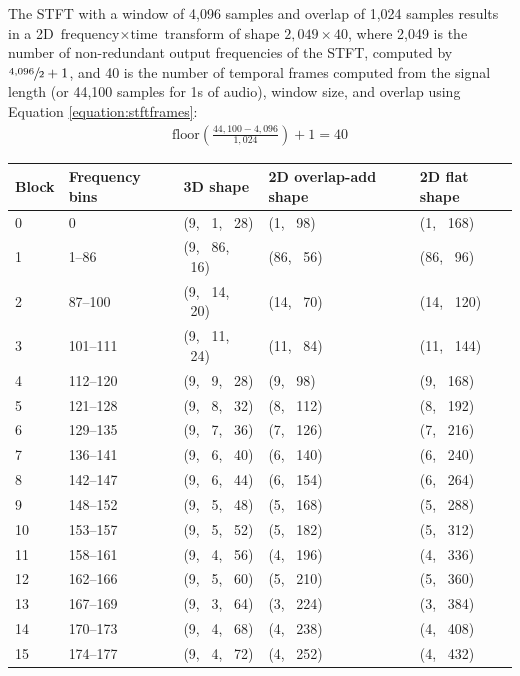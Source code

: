 \documentclass[report.tex]{subfiles}
\begin{document}
The STFT with a window of 4,096 samples and overlap of 1,024 samples results in a 2D $\text{frequency} \times \text{time}$ transform of shape $2{,}049 \times 40$, where 2,049 is the number of non-redundant output frequencies of the STFT, computed by $\sfrac{4{,}096}{2} + 1$, and 40 is the number of temporal frames computed from the signal length (or 44,100 samples for 1s of audio), window size, and overlap using Equation \ref{equation:stftframes}:
\begin{align}
	\text{floor}(\frac{44{,}100-4{,}096}{1{,}024}) + 1 = 40\tag{37}\label{equation:stftframes}
\end{align}

\begin{table}[ht]
	\centering
	\begin{tabular}{ |l|l|l|l|l| }
	 \hline
		Block & Frequency bins & 3D shape & 2D overlap-add shape & 2D flat shape \\
	 \hline
	 \hline
0 & 0 & (9, \ 1, \ 28) & (1, \ 98) & (1, \ 168) \\
\hline
1 & 1--86 & (9, \ 86, \ 16) & (86, \ 56) & (86, \ 96) \\
\hline
2 & 87--100 & (9, \ 14, \ 20) & (14, \ 70) & (14, \ 120) \\
\hline
3 & 101--111 & (9, \ 11, \ 24) & (11, \ 84) & (11, \ 144) \\
\hline
4 & 112--120 & (9, \ 9, \ 28) & (9, \ 98) & (9, \ 168) \\
\hline
5 & 121--128 & (9, \ 8, \ 32) & (8, \ 112) & (8, \ 192) \\
\hline
6 & 129--135 & (9, \ 7, \ 36) & (7, \ 126) & (7, \ 216) \\
\hline
7 & 136--141 & (9, \ 6, \ 40) & (6, \ 140) & (6, \ 240) \\
\hline
8 & 142--147 & (9, \ 6, \ 44) & (6, \ 154) & (6, \ 264) \\
\hline
9 & 148--152 & (9, \ 5, \ 48) & (5, \ 168) & (5, \ 288) \\
\hline
10 & 153--157 & (9, \ 5, \ 52) & (5, \ 182) & (5, \ 312) \\
\hline
11 & 158--161 & (9, \ 4, \ 56) & (4, \ 196) & (4, \ 336) \\
\hline
12 & 162--166 & (9, \ 5, \ 60) & (5, \ 210) & (5, \ 360) \\
\hline
13 & 167--169 & (9, \ 3, \ 64) & (3, \ 224) & (3, \ 384) \\
\hline
14 & 170--173 & (9, \ 4, \ 68) & (4, \ 238) & (4, \ 408) \\
\hline
15 & 174--177 & (9, \ 4, \ 72) & (4, \ 252) & (4, \ 432) \\

\end{tabular}
\end{table}
\end{document}
